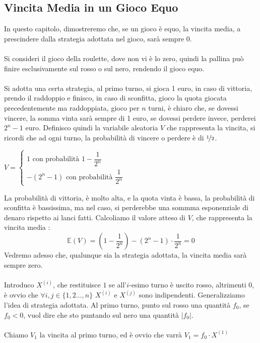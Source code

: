 \documentclass[12pt, letterpaper]{article}
\newcommand{\E}{{\mathbb E}}
\newcommand{\acc}{\\\hphantom{}\\}
\begin{document}
\subsection{Vincita Media in un Gioco Equo}
In questo capitolo, dimostreremo che, se un gioco è equo, la vincita media, a prescindere dalla strategia 
adottata nel gioco, sarà sempre 0.\acc 
Si consideri il gioco della roulette, dove non vi è lo zero, quindi la pallina può finire esclusivamente sul 
rosso o sul nero, rendendo il gioco equo. \acc 
Si adotta una certa strategia, al primo turno, si gioca 1 euro, in caso di vittoria, prendo il raddoppio e finisco, 
in caso di sconfitta, gioco la quota giocata precedentemente ma raddoppiata, gioco per \(n\) turni, è chiaro che, 
se dovessi vincere, la somma vinta sarà sempre di 1 euro, se dovessi perdere invece, perderei 
\(2^n-1\) euro. Definisco quindi la variabile aleatoria \(V\) che rappresenta la vincita, si ricordi che ad 
ogni turno, la probabilità di vincere o perdere è di \(\nicefrac{1}{2}\).\begin{center}
    \(V=\begin{cases}
        1 \text{ con probabilità } 1-\dfrac{1}{2^n}\\
        -(2^n-1) \text{ con probabilità } \dfrac{1}{2^n}
    \end{cases}\)
\end{center}
La probabilità di vittoria, è molto alta, e la quota vinta è bassa, la probabilità di sconfitta è bassissima, 
ma nel caso, si perderebbe una sommma esponenziale di denaro rispetto ai lanci fatti. Calcoliamo il 
valore atteso di \(V\), che rappresenta la vincita media : \begin{equation}
    \E(V)=(1-\dfrac{1}{2^n})-(2^n-1)\cdot\dfrac{1}{2^n}=0
\end{equation}
Vedremo adesso che, qualunque sia la strategia adottata, la vincita media sarà sempre zero.\acc 
Introduco \(X^{(i)}\), che restituisce \(1\) se all'\(i\)-esimo turno è uscito rosso, altrimenti 0, è ovvio che 
\(\forall i,j\in\{1,2\dots,n\}\) \(X^{(i)}\) e \(X^{(j)}\) sono indipendenti. Generalizziamo l'idea di 
strategia adottata. Al primo turno, punto sul rosso una quantità \(f_0\), se \(f_0<0\), vuol 
dire che sto puntando sul nero una quantità \(|f_0|\). \acc Chiamo \(V_1\) la vincita al primo turno, 
ed è ovvio che varrà \(V_1=f_0\cdot X^{(1)}\)\acc
\end{document}
